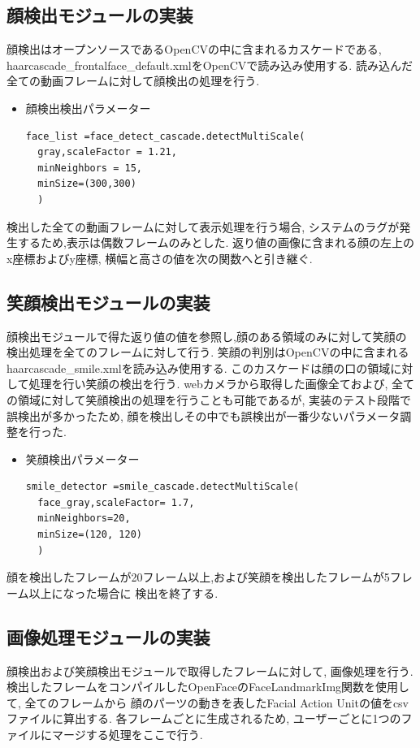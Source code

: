 \subsection{顔検出モジュールの実装}
顔検出はオープンソースであるOpenCVの中に含まれるカスケードである,
haarcascade\_frontalface\_default.xmlをOpenCVで読み込み使用する.
読み込んだ全ての動画フレームに対して顔検出の処理を行う.
\begin{itemize}
\item 顔検出検出パラメーター
\begin{lstlisting}
face_list =face_detect_cascade.detectMultiScale(
  gray,scaleFactor = 1.21,
  minNeighbors = 15,
  minSize=(300,300)
  )
\end{lstlisting}
\end{itemize}
検出した全ての動画フレームに対して表示処理を行う場合, システムのラグが発生するため,表示は偶数フレームのみとした.
返り値の画像に含まれる顔の左上のx座標およびy座標, 横幅と高さの値を次の関数へと引き継ぐ.

\subsection{笑顔検出モジュールの実装}
顔検出モジュールで得た返り値の値を参照し,顔のある領域のみに対して笑顔の検出処理を全てのフレームに対して行う.
笑顔の判別はOpenCVの中に含まれるhaarcascade\_smile.xmlを読み込み使用する.
このカスケードは顔の口の領域に対して処理を行い笑顔の検出を行う.
webカメラから取得した画像全ておよび, 全ての領域に対して笑顔検出の処理を行うことも可能であるが,
実装のテスト段階で誤検出が多かったため, 顔を検出しその中でも誤検出が一番少ないパラメータ調整を行った.

\begin{itemize}
\item 笑顔検出パラメーター
\begin{lstlisting}
smile_detector =smile_cascade.detectMultiScale(
  face_gray,scaleFactor= 1.7,
  minNeighbors=20,
  minSize=(120, 120)
  )
\end{lstlisting}
\end{itemize}

顔を検出したフレームが20フレーム以上,および笑顔を検出したフレームが5フレーム以上になった場合に
検出を終了する.

\subsection{画像処理モジュールの実装}
顔検出および笑顔検出モジュールで取得したフレームに対して, 画像処理を行う.
検出したフレームをコンパイルしたOpenFaceのFaceLandmarkImg関数を使用して, 全てのフレームから
顔のパーツの動きを表したFacial Action Unitの値をcsvファイルに算出する.
各フレームごとに生成されるため, ユーザーごとに1つのファイルにマージする処理をここで行う.

